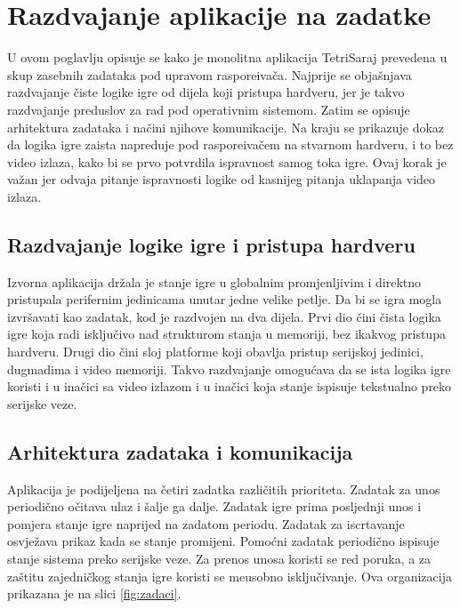 \chapter{Razdvajanje aplikacije na zadatke}
\label{ch:zadaci}

U ovom poglavlju opisuje se kako je monolitna aplikacija TetriSaraj prevedena u
skup zasebnih zadataka pod upravom raspore\dj{}iva\v{c}a. Najprije se obja\v{s}njava
razdvajanje \v{c}iste logike igre od dijela koji pristupa hardveru, jer je takvo
razdvajanje preduslov za rad pod operativnim sistemom. Zatim se opisuje
arhitektura zadataka i na\v{c}ini njihove komunikacije. Na kraju se prikazuje
dokaz da logika igre zaista napreduje pod raspore\dj{}iva\v{c}em na stvarnom
hardveru, i to bez video izlaza, kako bi se prvo potvrdila ispravnost samog
toka igre. Ovaj korak je va\v{z}an jer odvaja pitanje ispravnosti logike od
kasnijeg pitanja uklapanja video izlaza.

\section{Razdvajanje logike igre i pristupa hardveru}
\label{sec:zadaci-razdvajanje}

Izvorna aplikacija dr\v{z}ala je stanje igre u globalnim promjenljivim i
direktno pristupala perifernim jedinicama unutar jedne velike petlje. Da bi se
igra mogla izvr\v{s}avati kao zadatak, kod je razdvojen na dva dijela. Prvi dio
\v{c}ini \v{c}ista logika igre koja radi isklju\v{c}ivo nad strukturom stanja u
memoriji, bez ikakvog pristupa hardveru. Drugi dio \v{c}ini sloj platforme koji
obavlja pristup serijskoj jedinici, dugmadima i video memoriji. Takvo
razdvajanje omogu\'cava da se ista logika igre koristi i u ina\v{c}ici sa video
izlazom i u ina\v{c}ici koja stanje ispisuje tekstualno preko serijske veze.

\section{Arhitektura zadataka i komunikacija}
\label{sec:zadaci-arhitektura}

Aplikacija je podijeljena na \v{c}etiri zadatka razli\v{c}itih prioriteta.
Zadatak za unos periodi\v{c}no o\v{c}itava ulaz i \v{s}alje ga dalje. Zadatak
igre prima posljednji unos i pomjera stanje igre naprijed na zadatom periodu.
Zadatak za iscrtavanje osvje\v{z}ava prikaz kada se stanje promijeni. Pomo\'cni
zadatak periodi\v{c}no ispisuje stanje sistema preko serijske veze. Za prenos
unosa koristi se red poruka, a za za\v{s}titu zajedni\v{c}kog stanja igre koristi
se me\dj{}usobno isklju\v{c}ivanje. Ova organizacija prikazana je na slici
\ref{fig:zadaci}.

